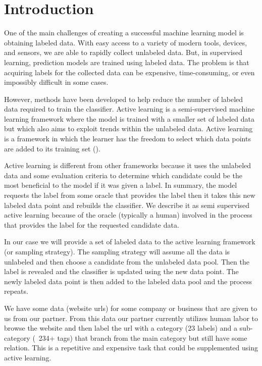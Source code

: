 \chapter*{Introduction}

One of the main challenges of creating a successful machine learning model is obtaining labeled data. With easy access to a variety of modern tools, devices, and sensors, we are able to rapidly collect unlabeled data. But, in supervised learning, prediction models are trained using labeled data. The problem is that acquiring labels for the collected data can be expensive, time-consuming, or even impossibly difficult in some cases.  

However, methods have been developed to help reduce the number of labeled data required to train the classifier. Active learning is a semi-supervised machine learning framework where the model is trained with a smaller set of labeled data but which also aims to exploit trends within the unlabeled data. Active learning is a framework in which the learner has the freedom to select which data points are added to its training set (\cite{roy2001eer}). 

Active learning is different from other frameworks because it uses the unlabeled data and some evaluation criteria to determine which candidate could be the most beneficial to the model if it was given a label. In summary, the model requests the label from some oracle that provides the label then it takes this new labeled data point and rebuilds the classifier. We describe it as semi supervised active learning because of the oracle (typically a human) involved in the process that provides the label for the requested candidate data. 

In our case we will provide a set of labeled data to the active learning framework (or sampling strategy). The sampling strategy will assume all the data is unlabeled and then choose a candidate from the unlabeled data pool. Then the label is revealed and the classifier is updated using the new data point. The newly labeled data point is then added to the labeled data pool and the process repeats.

We have some data (website urls) for some company or business that are given to us from our partner. From this data our partner currently utilizes human labor to browse the website and then label the url with a category (23 labels) and a sub-category (~234+ tags) that branch from the main category but still have some relation. This is a repetitive and expensive task that could be supplemented using active learning.

